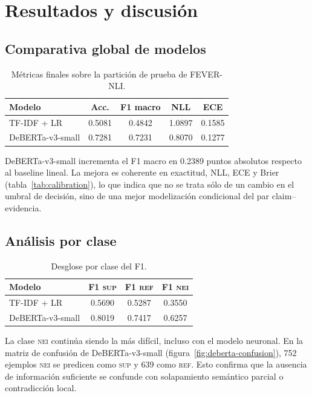 \chapter{Resultados y discusión}\label{cap:resultados}

\section{Comparativa global de modelos}

\begin{table}[h]
  \centering
  \begin{tabular}{lcccc}
    \toprule
    Modelo & Acc. & F1 macro & NLL & ECE \\
    \midrule
    TF-IDF + LR        & 0.5081 & 0.4842 & 1.0897 & 0.1585 \\
    DeBERTa-v3-small   & 0.7281 & 0.7231 & 0.8070 & 0.1277 \\
    \bottomrule
  \end{tabular}
  \caption{Métricas finales sobre la partición de prueba de FEVER-NLI.}
  \label{tab:resultados-globales}
\end{table}

DeBERTa-v3-small incrementa el F1 macro en 0.2389 puntos absolutos
respecto al baseline lineal. La mejora es coherente en exactitud, NLL,
ECE y Brier (tabla~\ref{tab:calibration}), lo que indica que no se
trata sólo de un cambio en el umbral de decisión, sino de una mejor
modelización condicional del par claim--evidencia.

\section{Análisis por clase}

\begin{table}[h]
  \centering
  \begin{tabular}{lccc}
    \toprule
    Modelo & F1 \textsc{sup} & F1 \textsc{ref} & F1 \textsc{nei} \\
    \midrule
    TF-IDF + LR       & 0.5690 & 0.5287 & 0.3550 \\
    DeBERTa-v3-small  & 0.8019 & 0.7417 & 0.6257 \\
    \bottomrule
  \end{tabular}
  \caption{Desglose por clase del F1.}
  \label{tab:resultados-por-clase}
\end{table}

La clase \textsc{nei} continúa siendo la más difícil, incluso con el
modelo neuronal. En la matriz de confusión de DeBERTa-v3-small
(figura~\ref{fig:deberta-confusion}), 752 ejemplos \textsc{nei} se
predicen como \textsc{sup} y 639 como \textsc{ref}. Esto confirma que
la ausencia de información suficiente se confunde con solapamiento
semántico parcial o contradicción local.


